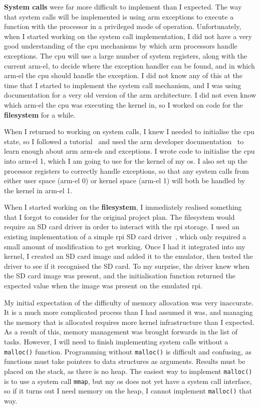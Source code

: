 \documentclass{article}
\begin{document}
\textbf{System calls} were far more difficult to implement than I expected. The
way that system calls will be implemented is using \gls{arm} exceptions
to execute a function with the processor in a privileged mode of operation.
Unfortunately, when I started working on the system call implementation, I did
not have a very good understanding of the \gls{cpu} mechanisms by which
\gls{arm} processors handle exceptions. The \gls{cpu} will use a large number
of system registers, along with the current \gls{arm-el}, to decide where the
exception handler can be found, and in which \gls{arm-el} the \gls{cpu} should
handle the exception. I did not know any of this at the time that I started to
implement the system call mechanism, and I was using documentation for a very
old version of the \gls{arm} architecture. I did not even know which
\gls{arm-el} the \gls{cpu} was executing the kernel in, so I worked on code for
the \textbf{filesystem} for a while.

When I returned to working on system calls, I knew I needed to initialise the
\gls{cpu} state, so I followed a tutorial~\cite{raspberry-pi-os-gh} and used
the \gls{arm} developer documentation~\cite{arm-developer-regs} to learn enough
about \gls{arm} \glspl{arm-el} and exceptions. I wrote code to initialise the
\gls{cpu} into \gls{arm-el} 1, which I am going to use for the kernel of my
\gls{os}. I also set up the processor registers to correctly handle exceptions,
so that any system calls from either user space (\gls{arm-el} 0) or kernel
space (\gls{arm-el} 1) will both be handled by the kernel in \gls{arm-el} 1.

When I started working on the \textbf{filesystem}, I immediately realised
something that I forgot to consider for the original project plan. The
filesystem would require an SD card driver in order to interact with the
\gls{rpi} storage. I used an existing implementation of a simple \gls{rpi} SD
card driver~\cite{rpi-boot-gh}, which only required a small amount of
modification to get working. Once I had it integrated into my kernel, I created
an SD card image and added it to the emulator, then tested the driver to see if
it recognised the SD card. To my surprise, the driver knew when the SD card
image was present, and the initialisation function returned the expected value
when the image was present on the emulated \gls{rpi}.

My initial expectation of the difficulty of memory allocation was very
inaccurate. It is a much more complicated process than I had assumed it was,
and managing the memory that is allocated requires more kernel infrastructure
than I expected. As a result of this, memory management was brought forwards in
the list of tasks. However, I will need to finish implementing system calls
without a \texttt{malloc()} function. Programming without \texttt{malloc()} is
difficult and confusing, as functions must take pointers to data structures as
arguments. Results must be placed on the stack, as there is no heap. The
easiest way to implement \texttt{malloc()} is to use a system call
\texttt{mmap}, but my \gls{os} does not yet have a system call interface, so if
it turns out I need memory on the heap, I cannot implement \texttt{malloc()}
that way.
\end{document}
